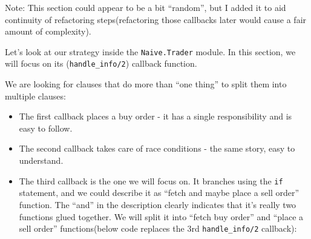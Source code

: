 \documentclass[
  oneside]{book}
\providecommand{\tightlist}{%
  \setlength{\itemsep}{0pt}\setlength{\parskip}{0pt}}
\begin{document}
Note: This section could appear to be a bit ``random'', but I added it to aid continuity of refactoring steps(refactoring those callbacks later would cause a fair amount of complexity).

Let's look at our strategy inside the \texttt{Naive.Trader} module. In this section, we will focus on its (\texttt{handle\_info/2}) callback function.

We are looking for clauses that do more than ``one thing'' to split them into multiple clauses:

\begin{itemize}
\tightlist
\item
  The first callback places a buy order - it has a single responsibility and is easy to follow.
\item
  The second callback takes care of race conditions - the same story, easy to understand.
\item
  The third callback is the one we will focus on. It branches using the \texttt{if} statement, and we could describe it as ``fetch and maybe place a sell order'' function. The ``and'' in the description clearly indicates that it's really two functions glued together. We will split it into ``fetch buy order'' and ``place a sell order'' functions(below code replaces the 3rd \texttt{handle\_info/2} callback):
\end{itemize}
\end{document}
